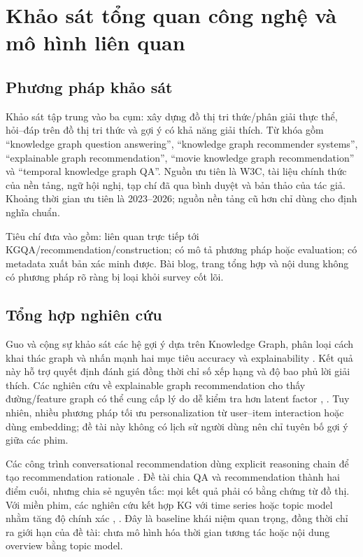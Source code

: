 \section{Khảo sát tổng quan công nghệ và mô hình liên quan}

\subsection{Phương pháp khảo sát}

Khảo sát tập trung vào ba cụm: xây dựng đồ thị tri thức/phân giải thực thể,
hỏi--đáp trên đồ thị tri thức và gợi ý có khả năng giải thích. Từ khóa gồm “knowledge
graph question answering”, “knowledge graph recommender systems”, “explainable
graph recommendation”, “movie knowledge graph recommendation” và “temporal
knowledge graph QA”. Nguồn ưu tiên là W3C, tài liệu chính thức của nền tảng,
ngữ hội nghị, tạp chí đã qua bình duyệt và bản thảo của tác giả. Khoảng thời
gian ưu tiên là 2023–2026; nguồn nền tảng cũ hơn chỉ dùng cho định nghĩa chuẩn.

Tiêu chí đưa vào gồm: liên quan trực tiếp tới KGQA/recommendation/construction;
có mô tả phương pháp hoặc evaluation; có metadata xuất bản xác minh được. Bài
blog, trang tổng hợp và nội dung không có phương pháp rõ ràng bị loại khỏi survey
cốt lõi.

\subsection{Tổng hợp nghiên cứu}

Guo và cộng sự khảo sát các hệ gợi ý dựa trên Knowledge Graph, phân loại cách
khai thác graph và nhấn mạnh hai mục tiêu accuracy và explainability \cite{guo2023kgsurvey}. Kết quả
này hỗ trợ quyết định đánh giá đồng thời chỉ số xếp hạng và độ bao phủ lời giải thích.
Các nghiên cứu về explainable graph recommendation cho thấy đường/feature graph
có thể cung cấp lý do dễ kiểm tra hơn latent factor \cite{caro2023graph}, \cite{colas2023knowledge}. Tuy nhiên, nhiều
phương pháp tối ưu personalization từ user–item interaction hoặc dùng embedding;
đề tài này không có lịch sử người dùng nên chỉ tuyên bố gợi ý giữa các phim.

Các công trình conversational recommendation dùng explicit reasoning chain để
tạo recommendation rationale \cite{ren2024explicit}. Đề tài chia QA và recommendation thành hai
điểm cuối, nhưng chia sẻ nguyên tắc: mọi kết quả phải có bằng chứng từ đồ thị. Với miền
phim, các nghiên cứu kết hợp KG với time series hoặc topic model nhằm tăng độ
chính xác \cite{zhang2023movie}, \cite{saat2024enhanced}. Đây là baseline khái niệm quan trọng, đồng thời chỉ ra giới
hạn của đề tài: chưa mô hình hóa thời gian tương tác hoặc nội dung overview bằng
topic model.

